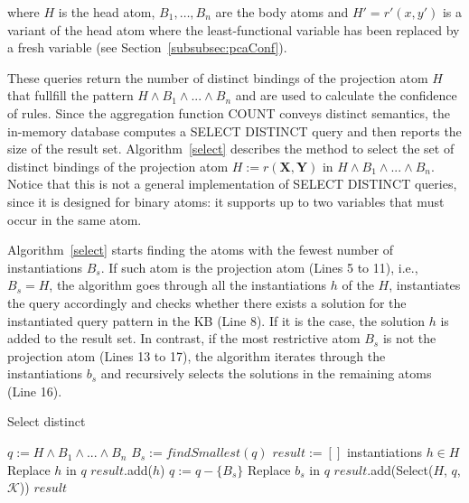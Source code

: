 \noindent where $H$ is the head atom, $B_1, \dots, B_n$ are the body atoms and $H'= r'(x,y')$ is a variant of the
head atom where the least-functional variable has been replaced by a fresh variable (see Section~\ref{subsubsec:pcaConf}).

These queries return the number of distinct bindings of the projection atom $H$ 
that fullfill the pattern $H \wedge B_1 \wedge ... \wedge B_n$ and are used to
calculate the confidence of rules. Since the aggregation function COUNT conveys
distinct semantics, the in-memory database computes a SELECT DISTINCT query 
and then reports the size of the result set. Algorithm~\ref{select} describes
the method to select the set of distinct bindings of the projection atom $H := r(\bm{X}, \bm{Y})$ in
$H \wedge B_1 \wedge ... \wedge B_n$. Notice that this is not a general implementation of SELECT DISTINCT queries,
since it is designed for binary atoms: it supports up to two variables that must occur in the same atom.

Algorithm~\ref{select} starts finding the atoms with the fewest number of instantiations $B_s$. If such atom is the
projection atom (Lines 5 to 11), i.e., $B_s = H$, the algorithm goes through all the instantiations $h$ of the $H$, instantiates
the query accordingly and checks whether there exists a solution for the instantiated query pattern in the KB (Line 8). 
If it is the case, the solution $h$ is added to the result set. In contrast, if the most restrictive atom $B_s$ is not 
the projection atom (Lines 13 to 17), the algorithm iterates through the instantiations $b_s$ and recursively 
selects the solutions in the remaining atoms (Line 16).

\begin{algorithm}
\caption{Select distinct}
\label{select}
\begin{algorithmic}[1]
    \State $q := H \wedge B_1 \wedge ... \wedge B_n$
    \State $B_s := findSmallest(q)$
    \State $result := [ ]$
      \ForAll instantiations $h \in H$
	\State Replace $h$ in $q$
	  \State $result$.add($h$)
	\EndIf
      \EndFor
    \Else
      \State $q := q - \{ B_s\}$
      	\State Replace $b_s$ in $q$
      	\State $result$.add(Select($H$, $q$, $\mathcal{K}$))
      \EndFor
    \EndIf
    \State \Return $result$
\EndFunction
\end{algorithmic}
\end{algorithm}




